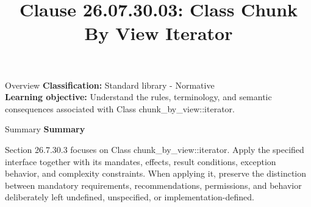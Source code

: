 \documentclass[10pt,letterpaper]{article}
\title{Clause 26.07.30.03: Class Chunk By View Iterator}
\author{}
\date{}
\begin{document}
\maketitle
\begin{CornellOverviewBox}{Overview}
\textbf{Classification:} Standard library - Normative\\[2pt]
\textbf{Learning objective:} Understand the rules, terminology, and semantic consequences associated with Class chunk\_by\_view::iterator.
\end{CornellOverviewBox}\begin{CornellSummaryBox}{Summary}
{\sffamily\bfseries\color{Accent} Summary}\par\vspace{3pt}Section 26.7.30.3 focuses on Class chunk\_by\_view::iterator. Apply the specified interface together with its mandates, effects, result conditions, exception behavior, and complexity constraints. When applying it, preserve the distinction between mandatory requirements, recommendations, permissions, and behavior deliberately left undefined, unspecified, or implementation-defined.
\end{CornellSummaryBox}
\end{document}
